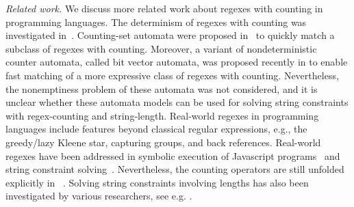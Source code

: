 \medskip
\noindent
\emph{Related work.} 
We discuss more related work about regexes with counting in programming languages.  
The determinism of regexes with counting was investigated in~\cite{GGM12,CL15}. Counting-set automata were proposed in~\cite{redos_lenka,HS+23} to quickly match a subclass of regexes with counting. Moreover, a variant of nondeterministic counter automata, called bit vector automata, was proposed recently in \cite{GKM23} to enable fast matching of a more expressive class of regexes with counting.   Nevertheless, the nonemptiness problem of these automata was not considered, and it is unclear whether these automata models can be used for solving string constraints with regex-counting and string-length.
Real-world regexes in programming languages include features beyond classical regular expressions, e.g., the greedy/lazy Kleene star, capturing groups, and back references.  Real-world regexes have been addressed in symbolic execution of Javascript programs~\cite{LMK19} and string constraint solving~\cite{CF+22}. Nevertheless, the counting operators are still unfolded explicitly in~\cite{CF+22} .  Solving string constraints involving lengths has also been investigated by various researchers, see e.g. \cite{WC+18,atva2020,z3str3re}. 


